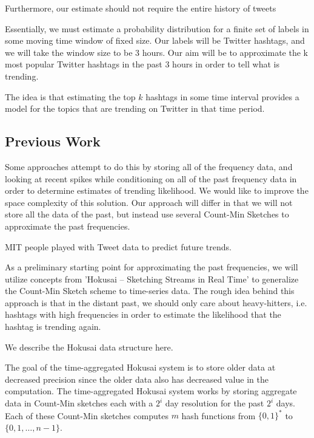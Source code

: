 \documentclass[twoside]{article}
\newcommand{\cc}[1]
 {\textbf{\cite{#1}}}
\begin{document}
Furthermore, our estimate should not require the entire history of tweets 

Essentially, we must estimate a probability distribution for a finite set of labels in some moving time window of fixed size. Our labels will be Twitter hashtags, and we will take the window size to be 3 hours.
Our aim will be to approximate the k most popular Twitter hashtags in the past 3 hours in order to tell what is trending.

The idea is that estimating the top $k$ hashtags in some time interval provides a model for the topics that are trending on Twitter in that time period.


\subsection{Previous Work} \label{sec:PreviousWork}


Some approaches attempt to do this by storing all of the frequency data, and looking at recent spikes while conditioning on all of the past frequency data in order to determine estimates of trending likelihood. We would like to improve the space complexity of this solution. Our approach will differ in that we will not store all the data of the past, but instead use several Count-Min Sketches to approximate the past frequencies. 

MIT people played with Tweet data to predict future trends. 

As a preliminary starting point for approximating the past frequencies, we will utilize concepts from 'Hokusai -- Sketching Streams in Real Time' \cc{Matusevych:2012} to generalize the Count-Min Sketch scheme to time-series data. The rough idea behind this approach is that in the distant past, we should only care about heavy-hitters, i.e. hashtags with high frequencies in order to estimate the likelihood that the hashtag is trending again.

We describe the Hokusai data structure here. 

The goal of the time-aggregated Hokusai system is to store older data at decreased precision since the older data also has decreased value in the computation.  The time-aggregated Hokusai system works by storing aggregate data in Count-Min sketches each with a $2^i$ day resolution for the past $2^i$ days.  Each of these Count-Min sketches computes $m$ hash functions from $\{0,1\}^*$ to $\{0, 1, …, n-1\}$.
\end{document}
